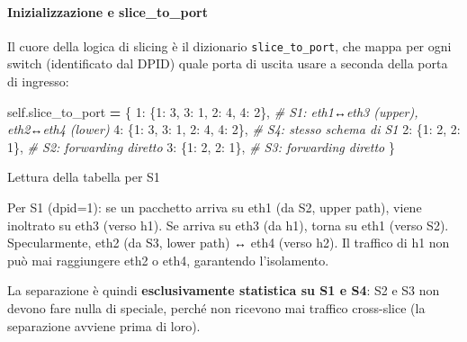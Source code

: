 \documentclass[
  italian,
  openany]{book}
\newenvironment{Shaded}{\begin{snugshade}}{\end{snugshade}}
\newcommand{\CommentTok}[1]{\textcolor[rgb]{0.56,0.35,0.01}{\textit{#1}}}
\newcommand{\DecValTok}[1]{\textcolor[rgb]{0.00,0.00,0.81}{#1}}
\newcommand{\NormalTok}[1]{#1}
\newcommand{\OperatorTok}[1]{\textcolor[rgb]{0.81,0.36,0.00}{\textbf{#1}}}
\newcommand{\VariableTok}[1]{\textcolor[rgb]{0.00,0.00,0.00}{#1}}
\begin{document}
\paragraph{Inizializzazione e
slice\_to\_port}\label{inizializzazione-e-slice_to_port}

Il cuore della logica di slicing è il dizionario
\texttt{slice\_to\_port}, che mappa per ogni switch (identificato dal
DPID) quale porta di uscita usare a seconda della porta di ingresso:

\begin{Shaded}
\begin{Highlighting}[]
\VariableTok{self}\NormalTok{.slice\_to\_port }\OperatorTok{=}\NormalTok{ \{}
    \DecValTok{1}\NormalTok{: \{}\DecValTok{1}\NormalTok{: }\DecValTok{3}\NormalTok{, }\DecValTok{3}\NormalTok{: }\DecValTok{1}\NormalTok{, }\DecValTok{2}\NormalTok{: }\DecValTok{4}\NormalTok{, }\DecValTok{4}\NormalTok{: }\DecValTok{2}\NormalTok{\},  }\CommentTok{\# S1: eth1↔eth3 (upper), eth2↔eth4 (lower)}
    \DecValTok{4}\NormalTok{: \{}\DecValTok{1}\NormalTok{: }\DecValTok{3}\NormalTok{, }\DecValTok{3}\NormalTok{: }\DecValTok{1}\NormalTok{, }\DecValTok{2}\NormalTok{: }\DecValTok{4}\NormalTok{, }\DecValTok{4}\NormalTok{: }\DecValTok{2}\NormalTok{\},  }\CommentTok{\# S4: stesso schema di S1}
    \DecValTok{2}\NormalTok{: \{}\DecValTok{1}\NormalTok{: }\DecValTok{2}\NormalTok{, }\DecValTok{2}\NormalTok{: }\DecValTok{1}\NormalTok{\},               }\CommentTok{\# S2: forwarding diretto}
    \DecValTok{3}\NormalTok{: \{}\DecValTok{1}\NormalTok{: }\DecValTok{2}\NormalTok{, }\DecValTok{2}\NormalTok{: }\DecValTok{1}\NormalTok{\},               }\CommentTok{\# S3: forwarding diretto}
\NormalTok{\}}
\end{Highlighting}
\end{Shaded}

\begin{callouttip}{Lettura della tabella per S1}

Per S1 (dpid=1): se un pacchetto arriva su eth1 (da S2, upper path),
viene inoltrato su eth3 (verso h1). Se arriva su eth3 (da h1), torna su
eth1 (verso S2). Specularmente, eth2 (da S3, lower path) ↔ eth4 (verso
h2). Il traffico di h1 non può mai raggiungere eth2 o eth4, garantendo
l'isolamento.

\end{callouttip}

La separazione è quindi \textbf{esclusivamente statistica su S1 e S4}:
S2 e S3 non devono fare nulla di speciale, perché non ricevono mai
traffico cross-slice (la separazione avviene prima di loro).
\end{document}
